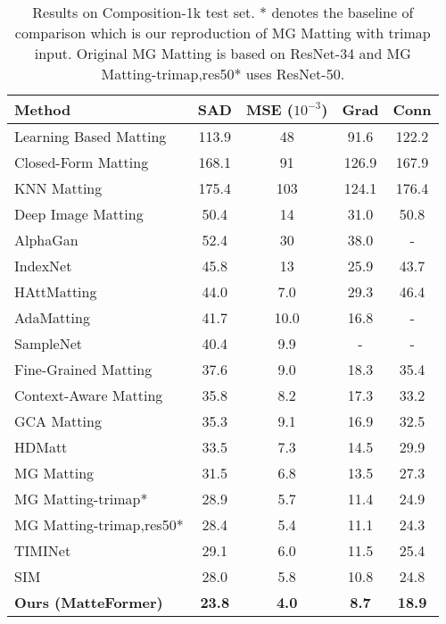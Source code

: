 \documentclass[10pt,twocolumn,letterpaper]{article}
\begin{document}
\begin{table}[t]
  \centering
  \begin{adjustbox}{width = \linewidth}
  \begin{tabular}{l | c c c c}
    \toprule
    Method & SAD & \makecell{MSE \\ ($10^{-3}$)} & Grad & Conn\\
    \midrule
    Learning Based Matting \cite{zheng2009learning} & 113.9 & 48 & 91.6 & 122.2 \\
    Closed-Form Matting \cite{levin2007closed} & 168.1 & 91 & 126.9 & 167.9 \\
    KNN Matting \cite{chen2013knn} & 175.4 & 103 & 124.1 & 176.4 \\
    Deep Image Matting \cite{xu2017deep} & 50.4 & 14 & 31.0 & 50.8 \\
    AlphaGan \cite{lutz2018alphagan} & 52.4 & 30 & 38.0 & - \\
    IndexNet \cite{lu2019indices} & 45.8 & 13 & 25.9 & 43.7 \\
    HAttMatting \cite{qiao2020attention} & 44.0 & 7.0 & 29.3 & 46.4 \\
    AdaMatting \cite{cai2019disentangled} & 41.7 & 10.0 & 16.8 & - \\
    SampleNet \cite{tang2019learning} & 40.4 & 9.9 & - & - \\
    Fine-Grained Matting \cite{liu2021towards} & 37.6 & 9.0 & 18.3 & 35.4 \\
    Context-Aware Matting \cite{hou2019context} & 35.8 & 8.2 & 17.3 & 33.2 \\
    GCA Matting \cite{li2020natural} & 35.3 & 9.1 & 16.9 & 32.5 \\
    HDMatt \cite{yu2020high} & 33.5 & 7.3 & 14.5 & 29.9 \\
MG Matting \cite{yu2021mask} & 31.5 & 6.8 & 13.5 & 27.3 \\
    MG Matting-trimap* & 28.9 & 5.7 & 11.4 & 24.9 \\
    MG Matting-trimap,res50* & 28.4 & 5.4 & 11.1 & 24.3 \\
    TIMINet \cite{liu2021tripartite} & 29.1 & 6.0 & 11.5 & 25.4 \\
    SIM \cite{sun2021semantic} & 28.0 & 5.8 & 10.8 & 24.8 \\
    \hline
    \bf{Ours (MatteFormer)} & \bf{23.8} & \bf{4.0} & \bf{8.7} & \bf{18.9} \\
    \bottomrule
  \end{tabular}
  \end{adjustbox}
  \caption{Results on Composition-1k test set. * denotes the baseline of comparison which is our reproduction of MG Matting with trimap input. Original MG Matting is based on ResNet-34 and MG Matting-trimap,res50* uses ResNet-50.}
  \label{tab:result_composition1k}
  \vspace{-2mm}
\end{table}
\end{document}

